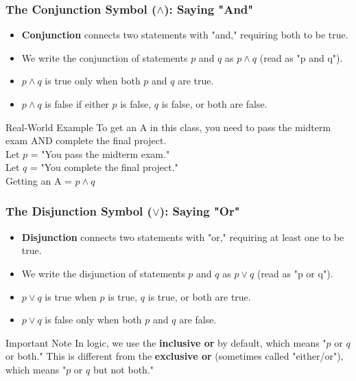 \documentclass{beamer}
\begin{document}
    \begin{frame}
    \frametitle{The Conjunction Symbol ($\wedge$): Saying "And"}
    \begin{itemize}
        \item \textbf{Conjunction} connects two statements with "and," requiring both to be true.
        \item We write the conjunction of statements $p$ and $q$ as $p \wedge q$ (read as "p and q").
        \item $p \wedge q$ is true only when both $p$ and $q$ are true.
        \item $p \wedge q$ is false if either $p$ is false, $q$ is false, or both are false.
    \end{itemize}
    
    \begin{block}{Real-World Example}
    To get an A in this class, you need to pass the midterm exam AND complete the final project.\\
    Let $p$ = "You pass the midterm exam."\\
    Let $q$ = "You complete the final project."\\
    Getting an A = $p \wedge q$
    \end{block}
    \end{frame}
    
    \begin{frame}
    \frametitle{The Disjunction Symbol ($\vee$): Saying "Or"}
    \begin{itemize}
        \item \textbf{Disjunction} connects two statements with "or," requiring at least one to be true.
        \item We write the disjunction of statements $p$ and $q$ as $p \vee q$ (read as "p or q").
        \item $p \vee q$ is true when $p$ is true, $q$ is true, or both are true.
        \item $p \vee q$ is false only when both $p$ and $q$ are false.
    \end{itemize}
    
    \begin{alertblock}{Important Note}
    In logic, we use the \textbf{inclusive or} by default, which means "$p$ or $q$ or both."
    This is different from the \textbf{exclusive or} (sometimes called "either/or"), which means "$p$ or $q$ but not both."
    \end{alertblock}
    \end{frame}
    
\end{document}
